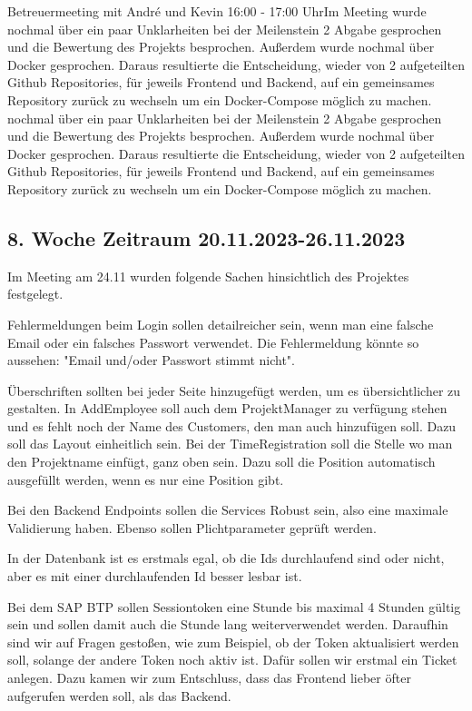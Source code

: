 \documentclass{article}
\begin{document}
Betreuermeeting mit André und Kevin 16:00 - 17:00 Uhr\newline Im Meeting wurde
nochmal über ein paar Unklarheiten bei der Meilenstein 2 Abgabe gesprochen und
die Bewertung des Projekts besprochen. Außerdem wurde nochmal über Docker
gesprochen. Daraus resultierte die Entscheidung, wieder von 2 aufgeteilten
Github Repositories, für jeweils Frontend und Backend, auf ein gemeinsames
Repository zurück zu wechseln um ein Docker-Compose möglich zu machen. nochmal
über ein paar Unklarheiten bei der Meilenstein 2 Abgabe gesprochen und die
Bewertung des Projekts besprochen. Außerdem wurde nochmal über Docker
gesprochen. Daraus resultierte die Entscheidung, wieder von 2 aufgeteilten
Github Repositories, für jeweils Frontend und Backend, auf ein gemeinsames
Repository zurück zu wechseln um ein Docker-Compose möglich zu machen.

\newpage

\subsection{8. Woche Zeitraum 20.11.2023-26.11.2023}
Im Meeting am 24.11 wurden folgende Sachen hinsichtlich des Projektes
festgelegt.

Fehlermeldungen beim Login sollen detailreicher sein, wenn man eine falsche
Email oder ein falsches Passwort verwendet. Die Fehlermeldung könnte so
aussehen: "Email und/oder Passwort stimmt nicht".

Überschriften sollten bei jeder Seite hinzugefügt werden, um es übersichtlicher zu gestalten.
In AddEmployee soll auch dem ProjektManager zu verfügung stehen und es fehlt noch der Name des Customers, den man auch hinzufügen soll. Dazu soll das Layout einheitlich sein.
Bei der TimeRegistration soll die Stelle wo man den Projektname einfügt, ganz oben sein. Dazu soll die Position automatisch ausgefüllt werden, wenn es nur eine Position gibt.

Bei den Backend Endpoints sollen die Services Robust sein, also eine maximale
Validierung haben. Ebenso sollen Plichtparameter geprüft werden.

In der Datenbank ist es erstmals egal, ob die Ids durchlaufend sind oder nicht,
aber es mit einer durchlaufenden Id besser lesbar ist.

Bei dem SAP BTP sollen Sessiontoken eine Stunde bis maximal 4 Stunden gültig
sein und sollen damit auch die Stunde lang weiterverwendet werden. Daraufhin
sind wir auf Fragen gestoßen, wie zum Beispiel, ob der Token aktualisiert
werden soll, solange der andere Token noch aktiv ist. Dafür sollen wir erstmal
ein Ticket anlegen. Dazu kamen wir zum Entschluss, dass das Frontend lieber
öfter aufgerufen werden soll, als das Backend.
\end{document}
